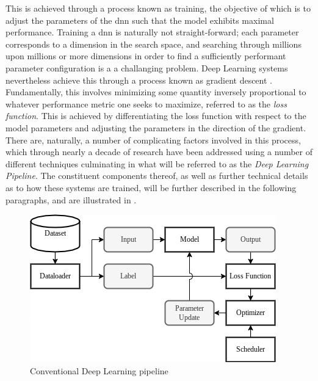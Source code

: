     This is achieved through a process known as training, the objective of which is to adjust the parameters of the \gls{dnn} such that the model exhibits maximal performance. Training a \gls{dnn} is naturally not straight-forward; each parameter corresponds to a dimension in the search space, and searching through millions upon millions or more dimensions in order to find a sufficiently performant parameter configuration is a a challanging problem. Deep Learning systems nevertheless achieve this through a process known as gradient descent \cite{gradient_descent_overview}. Fundamentally, this involves minimizing some quantity inversely proportional to whatever performance metric one seeks to maximize, referred to as the \textit{loss function}. This is achieved by differentiating the loss function with respect to the model parameters and adjusting the parameters in the direction of the gradient. There are, naturally, a number of complicating factors involved in this process, which through nearly a decade of research have been addressed using a number of different techniques culminating in what will be referred to as the \textit{Deep Learning Pipeline}. The constituent components thereof, as well as further technical details as to how these systems are trained, will be further described in the following paragraphs, and are illustrated in . 
    
    \begin{figure}[h]
        \centering
        \includegraphics[width=0.75\linewidth]{illustrations/pipeline.png}
        \caption{Conventional Deep Learning pipeline}
        \label{fig:pipeline}
    \end{figure}
    

